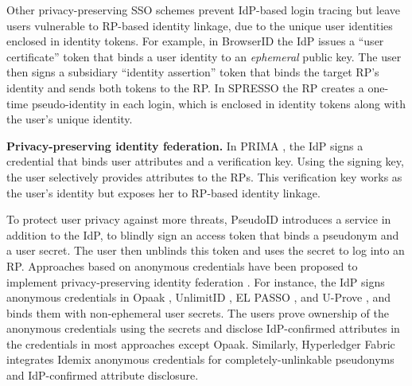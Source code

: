 Other privacy-preserving SSO schemes prevent IdP-based login tracing but leave users vulnerable to RP-based identity linkage, due to the unique user identities enclosed in identity tokens.
For example, in BrowserID \cite{BrowserID} %
the IdP %
issues a ``user certificate'' token that binds a user identity to an \emph{ephemeral} public key. The user then signs a subsidiary ``identity assertion'' token that binds the target RP's identity and sends both tokens to the RP. In SPRESSO \cite{SPRESSO} the RP creates a one-time pseudo-identity in each login, which is enclosed in identity tokens along with the user's unique identity.

\newc
\noindent\textbf{Privacy-preserving identity federation.}
\oldc
In PRIMA \cite{prima}, the IdP signs a credential
that binds user attributes and a verification key. Using the signing key, the user selectively provides attributes to the RPs. This verification key works as the user's identity but exposes her to RP-based identity linkage.

To protect user privacy against more threats, PseudoID \cite{PseudoID} introduces a service in addition to the IdP,
 to blindly sign \cite{blind-sign}
an access token that binds a pseudonym and a user secret.
The user then unblinds this token and uses the secret to log into an RP. Approaches based on anonymous credentials \cite{anon-credential-2001, idemix, anon-credential} have been proposed to implement privacy-preserving identity federation \cite{hyperledge-idemix, Opaak, uprov, UnlimitID, ELPASSO}. For instance, the IdP signs anonymous credentials in Opaak \cite{Opaak}, UnlimitID \cite{UnlimitID}, EL PASSO \cite{ELPASSO}, and U-Prove \cite{uprov,uprove-conference}, and binds them with non-ephemeral user secrets. %
The users prove ownership of the anonymous credentials using the secrets and disclose IdP-confirmed attributes in the credentials in most approaches except Opaak. Similarly, Hyperledger Fabric \cite{hyperledge-idemix} integrates Idemix anonymous credentials \cite{idemix} for completely-unlinkable pseudonyms and IdP-confirmed attribute disclosure.


